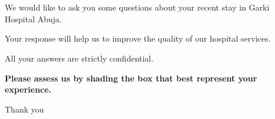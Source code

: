 \documentclass[a4paper,24pt]{article}%
\begin{document}
%
\pagestyle{empty}%
\normalsize%
%
%
\section*{}%
\begin{large}%
We would like to ask you some questions about your recent stay in Garki Hospital Abuja.%
\end{large}%
\newline%
%
\begin{large}%
Your response will help us to improve the quality of our hospital services.%
\end{large}%
\newline%
%
\begin{large}%
All your answers are strictly confidential.%
\end{large}%
\newline%
%
\begin{large}%
\textbf{Please assess us by shading the box that best represent your experience.}%
\end{large}%
\newline%
%
\begin{large}%
Thank you%
\end{large}%
\newline%
%
\newline%
\end{document}
